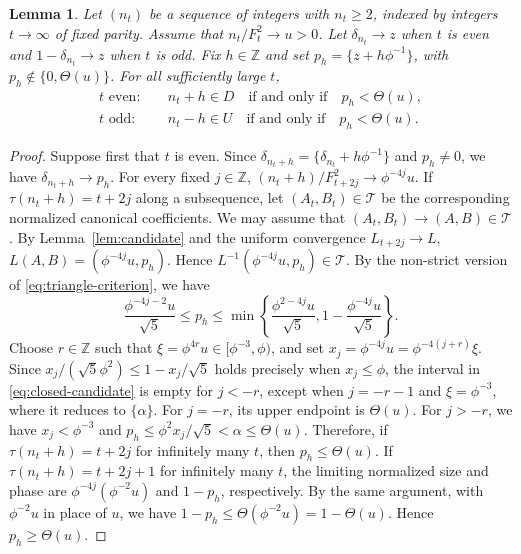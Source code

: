 \documentclass[11pt]{amsart}
\newtheorem{lemma}[theorem]{Lemma}
\theoremstyle{definition}
\newcommand{\Tcal}{\mathcal T}
\begin{document}
\begin{lemma}\label{lem:layer-coding}
Let $(n_t)$ be a sequence of integers with $n_t\geq2$, indexed by integers $t\to\infty$ of fixed parity. Assume that $n_t/F_t^2\to u>0$. Let $\delta_{n_t}\to z$ when $t$ is even and $1-\delta_{n_t}\to z$ when $t$ is odd. Fix $h\in\mathbb Z$ and set $p_h=\{z+h\phi^{-1}\}$, with $p_h\notin\{0,\Theta(u)\}$. For all sufficiently large
$t$,
\begin{align}
t\text{ even}:\quad&
n_t+h\in D\quad\text{if and only if}\quad p_h<\Theta(u),\label{eq:layer-code-D}\\
t\text{ odd}:\quad&
n_t-h\in U\quad\text{if and only if}\quad p_h<\Theta(u).
\label{eq:layer-code-U}
\end{align}
\end{lemma}

\begin{proof}
Suppose first that $t$ is even. Since $\delta_{n_t+h}=\{\delta_{n_t}+h\phi^{-1}\}$ and $p_h\neq0$, we have $\delta_{n_t+h}\to p_h$. For every fixed $j\in\mathbb Z$, $(n_t+h)/F_{t+2j}^2\longrightarrow\phi^{-4j}u$. If $\tau(n_t+h)=t+2j$ along a subsequence, let $(A_t,B_t)\in\Tcal$ be the corresponding normalized canonical coefficients. We may assume that $(A_t,B_t)\to(A,B)\in\Tcal$. By Lemma~\ref{lem:candidate} and the uniform convergence $L_{t+2j}\to L$, $L(A,B)=(\phi^{-4j}u,p_h)$. Hence $L^{-1}(\phi^{-4j}u,p_h)\in\Tcal$. By the non-strict version of \eqref{eq:triangle-criterion}, we have 
\begin{equation}\label{eq:closed-candidate}
\frac{\phi^{-4j-2}u}{\sqrt5}\leq p_h\leq
\min\left\{\frac{\phi^{2-4j}u}{\sqrt5},
1-\frac{\phi^{-4j}u}{\sqrt5}\right\}.
\end{equation}
Choose $r\in\mathbb Z$ such that
$\xi=\phi^{4r}u\in[\phi^{-3},\phi)$, and set
$x_j=\phi^{-4j}u=\phi^{-4(j+r)}\xi$. Since $x_j/(\sqrt5\phi^2)\leq1-x_j/\sqrt5$ holds precisely when $x_j\leq\phi$, the interval in \eqref{eq:closed-candidate} is empty for $j<-r$, except when $j=-r-1$ and $\xi=\phi^{-3}$, where it reduces to $\{\alpha\}$. For $j=-r$, its upper endpoint is $\Theta(u)$. For $j>-r$, we have $x_j<\phi^{-3}$ and $p_h\leq\phi^2x_j/\sqrt5<\alpha\leq\Theta(u)$. Therefore, if $\tau(n_t+h)=t+2j$ for infinitely many $t$, then $p_h\leq\Theta(u)$. If $\tau(n_t+h)=t+2j+1$ for infinitely many $t$, the limiting normalized size and phase are $\phi^{-4j}(\phi^{-2}u)$ and $1-p_h$, respectively. By the same argument, with $\phi^{-2}u$ in place of $u$, we have $1-p_h\leq\Theta(\phi^{-2}u)=1-\Theta(u)$. Hence $p_h\geq\Theta(u)$.


\end{proof}
\end{document}
